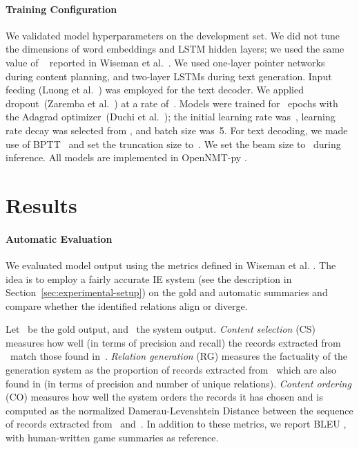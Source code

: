 \documentclass[letterpaper]{article} \usepackage{aaai19}  \usepackage{times}  \usepackage{helvet}  \usepackage{courier}  \usepackage{url}  \usepackage{graphicx}  \frenchspacing  \setlength{\pdfpagewidth}{8.5in}  \setlength{\pdfpageheight}{11in}  \graphicspath{ {images/} }
\begin{document}
\paragraph{Training Configuration}
We validated model hyperparameters on the development set. We did not tune the dimensions of word embeddings and LSTM hidden
layers; we used the same value of ~ reported in Wiseman et
al.~.  We used one-layer pointer
networks during content planning, and two-layer LSTMs during text
generation.  Input feeding (Luong et al.~\citeyear{D15-1166}) was
employed for the text decoder.  We applied dropout~(Zaremba et
al.~\citeyear{zaremba2014recurrent}) at a rate of~. Models
were trained for ~epochs with the Adagrad optimizer~(Duchi et
al.~\citeyear{duchi2011adaptive}); the initial learning rate
was~, learning rate decay was selected from , and
batch size was~5. For text decoding, we made use of
BPTT~\cite{mikolov2010recurrent} and set the truncation size to~.
We set the beam size to~ during inference.  All models are
implemented in OpenNMT-py \cite{klein2017opennmt}.





\section{Results}
\label{sec:results}

\paragraph{Automatic Evaluation}
We evaluated model output using the metrics defined in Wiseman et
al. .  The idea is to employ a fairly
accurate IE system (see the description in
Section~\ref{sec:experimental-setup}) on the gold and automatic
summaries and compare whether the identified relations align or
diverge.

Let ~be the gold output, and ~the system output.
\emph{Content selection} (CS) measures how well (in terms of precision
and recall) the records extracted from ~match those found
in~.  \emph{Relation generation} (RG) measures the factuality
of the generation system as the proportion of records extracted
from~ which are also found in  (in terms of precision and number
of unique relations). \emph{Content ordering} (CO) measures how well
the system orders the records it has chosen and is computed as the
normalized Damerau-Levenshtein Distance between the sequence of
records extracted from ~and~. In addition to these
metrics, we report BLEU \cite{papineni-EtAl:2002:ACL}, with 
human-written game summaries as reference.
\end{document}
